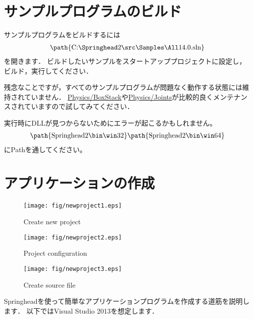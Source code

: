 \section{\KLUDGE サンプルプログラムのビルド}

\KLUDGE サンプルプログラムをビルドするには
\begin{align*}
\text{\path{C:\Springhead2\src\Samples\All14.0.sln}}
\end{align*}
\KLUDGE を開きます．
\KLUDGE ビルドしたいサンプルをスタートアッププロジェクトに設定し，ビルド，実行してください．

\KLUDGE 残念なことですが，すべてのサンプルプログラムが問題なく動作する状態には維持されていません．
\url{Physics/BoxStack}\KLUDGE や\url{Physics/Joints}\KLUDGE が比較的良くメンテナンスされていますので試してみてください．

\KLUDGE 実行時にDLL\KLUDGE が見つからないためにエラーが起こるかもしれません。
\begin{align*}
\text{\path{Springhead2\bin\win32}}
\text{\path{Springhead2\bin\win64}}
\end{align*}
\KLUDGE にPath\KLUDGE を通してください。

\section{\KLUDGE アプリケーションの作成}
\label{sec_create_application}

\begin{figure}[t]
\begin{center}
\texttt{[image: fig/newproject1.eps]}
\end{center}
\caption{Create new project}
\label{fig_newproject1}
\end{figure}

\begin{figure}[t]
\begin{center}
\texttt{[image: fig/newproject2.eps]}
\end{center}
\caption{Project configuration}
\label{fig_newproject2}
\end{figure}

\begin{figure}[t]
\begin{center}
\texttt{[image: fig/newproject3.eps]}
\end{center}
\caption{Create source file}
\label{fig_newproject3}
\end{figure}

Springhead\KLUDGE を使って簡単なアプリケーションプログラムを作成する道筋を説明します．
\KLUDGE 以下ではVisual Studio 2013\KLUDGE を想定します．

